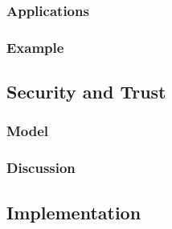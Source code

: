 
\subsubsection{Applications}


\subsubsection{Example}

\subsection{Security and Trust}

\subsubsection{Model}

\subsubsection{Discussion}

\subsection{Implementation}

